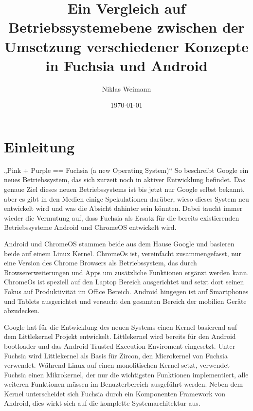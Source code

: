 \documentclass[a4paper]{scrartcl}
\begin{document}
\title{Ein Vergleich auf Betriebssystemebene zwischen der Umsetzung verschiedener Konzepte in Fuchsia und Android}
\author{Niklas Weimann}
\date{\today}

\maketitle
\tableofcontents
\newpage

\section{Einleitung}
„Pink + Purple == Fuchsia (a new Operating System)“\cite{fuchsia.Gettingstarted} So beschreibt Google ein neues Betriebssystem, das sich zurzeit noch in aktiver Entwicklung befindet. Das genaue Ziel dieses neuen Betriebssystems ist bis jetzt nur Google selbst bekannt, aber es gibt in den Medien einige Spekulationen darüber, wieso dieses System neu entwickelt wird und was die Absicht dahinter sein könnten. Dabei taucht immer wieder die Vermutung auf, dass Fuchsia als Ersatz für die bereits existierenden Betriebssysteme Android und ChromeOS entwickelt wird.

Android und ChromeOS stammen beide aus dem Hause Google und basieren beide auf einem Linux Kernel.  ChromeOs ist, vereinfacht zusammengefasst, nur eine Version des Chrome Browsers als Betriebssystem, das durch Browsererweiterungen und Apps um zusätzliche Funktionen ergänzt werden kann. ChromeOs ist speziell auf den Laptop Bereich ausgerichtet und setzt dort seinen Fokus auf Produktivität im Office Bereich. Android hingegen ist auf Smartphones und Tablets ausgerichtet und versucht den gesamten Bereich der mobilien Geräte abzudecken.

Google hat für die Entwicklung des neuen Systems einen Kernel basierend auf dem Littlekernel Projekt entwickelt. Littlekernel wird bereits für den Android bootloader \cite{Android.LittleKernel} und das Android Trusted Execution Enviroment \cite{Android.TrustyTee} eingesetzt. Unter Fuchsia wird Littlekernel als Basis für Zircon, den Microkernel von Fuchsia verwendet. Während Linux auf einen monolitischen Kernel setzt, verwendet Fuchsia einen Mikrokernel, der nur die wichtigsten Funktionen implementiert, alle weiteren Funktionen müssen im Benuzterbereich ausgeführt werden. Neben dem Kernel unterscheidet sich Fuchsia durch ein Komponenten Framework von Android, dies wirkt sich auf die komplette Systemarchitektur aus.
\end{document}
